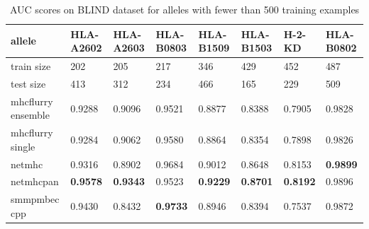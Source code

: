 \begin{table}[h]
\centering
\begin{tabular}{llllllll}
\toprule
allele &        HLA-A2602 &        HLA-A2603 &        HLA-B0803 &        HLA-B1509 &        HLA-B1503 &           H-2-KD &        HLA-B0802 \\
\midrule
train size         &              202 &              205 &              217 &              346 &              429 &              452 &              487 \\
test size          &              413 &              312 &              234 &              466 &              165 &              229 &              509 \\
mhcflurry ensemble &           0.9288 &           0.9096 &           0.9521 &           0.8877 &           0.8388 &           0.7905 &           0.9828 \\
mhcflurry single   &           0.9284 &           0.9062 &           0.9580 &           0.8864 &           0.8354 &           0.7898 &           0.9826 \\
netmhc             &           0.9316 &           0.8902 &           0.9684 &           0.9012 &           0.8648 &           0.8153 &  \textbf{0.9899} \\
netmhcpan          &  \textbf{0.9578} &  \textbf{0.9343} &           0.9523 &  \textbf{0.9229} &  \textbf{0.8701} &  \textbf{0.8192} &           0.9896 \\
smmpmbec cpp       &           0.9430 &           0.8432 &  \textbf{0.9733} &           0.8946 &           0.8394 &           0.7537 &           0.9872 \\
\bottomrule
\end{tabular}

\caption{AUC scores on BLIND dataset for alleles with fewer than 500 training examples}
\label{tab:smallalleles}
\end{table}